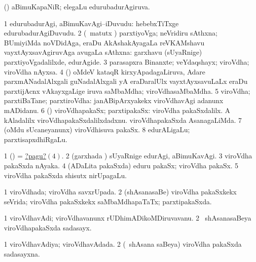 \bentry
{}
\gl{\gu}
\bmng
(\savi) aBimuKapaNiR; elegaLu edurubadurAgiruva. 
\emng
\eentry

\bentry
{}
\gl{\nA}
\bmng
\bnum
\num{1} edurubadurAgi, aBimuKavAgi--iDuvudu:  hebebxTiTxge edurubadurAgiDuvudu. 
\num{2} (\Kavi\ matutx \joyxV) parxtiyoVga; neVridiru sAthxna; BUmiyiMda noVDidAga, eraDu AkAshakAyagaLa reVKAMshavu  vayxtAyxsavAgiruvAga avugaLa sAthxna:  garxhavu (sUyaRnige) parxtiyoVgadalilxde, edurAgide. 
\num{3} parasapxra Binanxte; veYdaqshayx; viroVdha; viroVdha nAyxsa. 
\num{4} (\takaR) oMdeV kataqR kirxyApadagaLiruva, Adare parxmANadalAlxgali guNadalAlxgali yA eraDaralUlx vayxtAyxsavuLaLx eraDu parxtijAcnx vAkayxgaLige iruva saMbaMdha; viroVdhasaMbaMdha. 
\num{5} viroVdha; parxtiBaTane; parxtiroVdha:  janABipArxyakekx viroVdhavAgi adanunx mADidanu. 
\num{6} (\birx) viroVdhapakaSx; parxtipakaSx:  viroVdha pakaSxdalilx.  A kAladalilx viroVdhapakaSxdalilxdadxnu.  viroVdhapakaSxda AsanagaLiMda. 
\num{7} (oMdu sUcaneyanunx) viroVdhisuva pakaSx. 
\num{8} edurALigaLu; parxtisapxdhiRgaLu. 
\enum
\emng

\noindent
\gl{\pagu}
\bmng
\bnum
\num{1}  (\birx) = \hyperlink{opposionpagu4}{?pagu?\((4)\)}. 
\num{2}  (garxhada \vi) sUyaRnige edurAgi, aBimuKavAgi. 
\num{3}  viroVdha pakaSxda nAyaka. 
\hypertarget{opposionpagu4}{} 
\num{4}  (ADaLita pakaSxda) eduru pakaSx; viroVdha pakaSx. 
\num{5}  viroVdha pakaSxda shisutx nirUpagaLu. 
\enum
\emng
\eentry

\bentry
{}
\gl{\gu}
\bmng
\bnum
\num{1} viroVdhada; viroVdha savxrUpada. 
\num{2} (shAsanasaBe) viroVdha pakaSxkekx seVrida; viroVdha pakaSxkekx saMbaMdhapaTaTx; parxtipakaSxda. 
\enum
\emng
\eentry

\bentry
{}
\gl{\nA}
\bmng
\bnum
\num{1} viroVdhavAdi; viroVdhavanunx rUDhimADikoMDiruvavanu. 
\num{2} \kanmu\ shAsanasaBeya viroVdhapakaSxda sadasayx. 
\enum
\emng
\eentry

\bentry
{}
\gl{\gu}
\bmng
\bnum
\num{1} viroVdhavAdiya; viroVdhavAdada. 
\num{2} (\kanmu\ shAsana saBeya) viroVdha pakaSxda sadasayxna. 
\enum
\emng
\eentry

